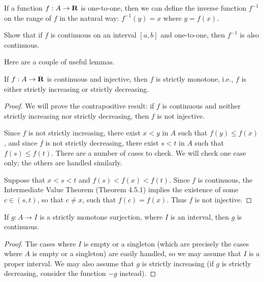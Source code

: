 \documentclass{lew98_solutions}
\begin{document}
\begin{exercise}
\label{ex:4.5.8}
    If a function \( f : A \to \mathbf{R} \) is one-to-one, then we can define the inverse function \( f^{-1} \) on the range of \( f \) in the natural way: \( f^{-1}(y) = x \) where \( y = f(x) \).

    Show that if \( f \) is continuous on an interval \( [a, b] \) and one-to-one, then \( f^{-1} \) is also continuous.
\end{exercise}

\begin{solution}
    Here are a couple of useful lemmas.

    \begin{lemma}
    \label{lem:ex4.5.8_1}
        If \( f : A \to \mathbf{R} \) is continuous and injective, then \( f \) is strictly monotone, i.e., \( f \) is either strictly increasing or strictly decreasing.
    \end{lemma}

    \begin{proof}
        We will prove the contrapositive result: if \( f \) is continuous and neither strictly increasing nor strictly decreasing, then \( f \) is not injective.

        Since \( f \) is not strictly increasing, there exist \( x < y \) in \( A \) such that \( f(y) \leq f(x) \), and since \( f \) is not strictly decreasing, there exist \( s < t \) in \( A \) such that \( f(s) \leq f(t) \). There are a number of cases to check. We will check one case only; the others are handled similarly.

        Suppose that \( x < s < t \) and \( f(s) < f(x) < f(t) \). Since \( f \) is continuous, the Intermediate Value Theorem (Theorem 4.5.1) implies the existence of some \( c \in (s, t) \), so that \( c \neq x \), such that \( f(c) = f(x) \). Thus \( f \) is not injective.
    \end{proof}

    \begin{lemma}
    \label{lem:ex4.5.8_2}
        If \( g : A \to I \) is a strictly monotone surjection, where \( I \) is an interval, then \( g \) is continuous.
    \end{lemma}

    \begin{proof}
        The cases where \( I \) is empty or a singleton (which are precisely the cases where \( A \) is empty or a singleton) are easily handled, so we may assume that \( I \) is a proper interval. We may also assume that \( g \) is strictly increasing (if \( g \) is strictly decreasing, consider the function \( -g \) instead).


\end{proof}
\end{solution}
\end{document}
